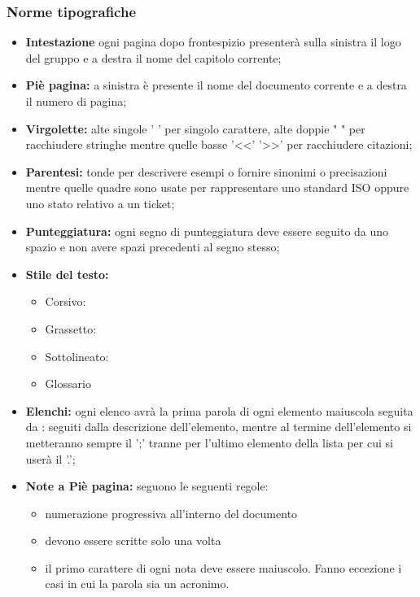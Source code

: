 \documentclass[NormeDiProgetto.tex]{subfiles}
\begin{document}
	\subsubsection{Norme tipografiche}
		\begin{itemize}
			\item \textbf{Intestazione} ogni pagina dopo frontespizio presenterà sulla sinistra il logo del gruppo e a destra il nome del capitolo corrente;
			
			\item \textbf{Piè pagina:} a sinistra è presente il nome del documento corrente e a destra il numero di pagina; 
			
			\item \textbf{Virgolette:} alte singole ' ' per singolo carattere, alte doppie " " per racchiudere stringhe mentre quelle basse '<<' '>>' per racchiudere citazioni;%
			 
			\item \textbf{Parentesi:} tonde per descrivere esempi o fornire sinonimi o precisazioni mentre quelle quadre sono usate per rappresentare uno standard ISO oppure uno stato relativo a un ticket;
			
			\item \textbf{Punteggiatura:} ogni segno di punteggiatura deve essere seguito da uno spazio e non avere spazi precedenti al segno stesso;

			\item \textbf{Stile del testo:} 
			\begin{itemize}
				\item Corsivo: %
				\item Grassetto:
				\item Sottolineato:
				\item Glossario %
			\end{itemize}
		
			\item \textbf{Elenchi:} ogni elenco avrà la prima parola di ogni elemento maiuscola seguita da : seguiti dalla descrizione dell'elemento, mentre al termine dell'elemento si metteranno sempre il ';' tranne per l'ultimo elemento della lista per cui si userà il '.';
			 
			\item \textbf{Note a Piè pagina:} seguono le seguenti regole: 
			\begin{itemize}
				\item numerazione progressiva all'interno del documento
				\item devono essere scritte solo una volta
				\item il primo carattere di ogni nota deve essere maiuscolo. Fanno eccezione i casi in cui la parola sia un acronimo.
			\end{itemize}
			 

\end{itemize}
\end{document}
